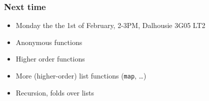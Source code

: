 \documentclass[final,handout]{beamer}
\begin{document}
%
%
%
%
%
%
%
%





\begin{frame}
    \frametitle{Next time}

    \begin{itemize}
        \item Monday the the 1st of February, 2-3PM,
            Dalhousie 3G05 LT2
        
        \item Anonymous functions
        \item Higher order functions
        \item More (higher-order) list functions (\texttt{map}, \dots)
        \item Recursion, folds over lists

    \end{itemize}

\end{frame}
\end{document}
